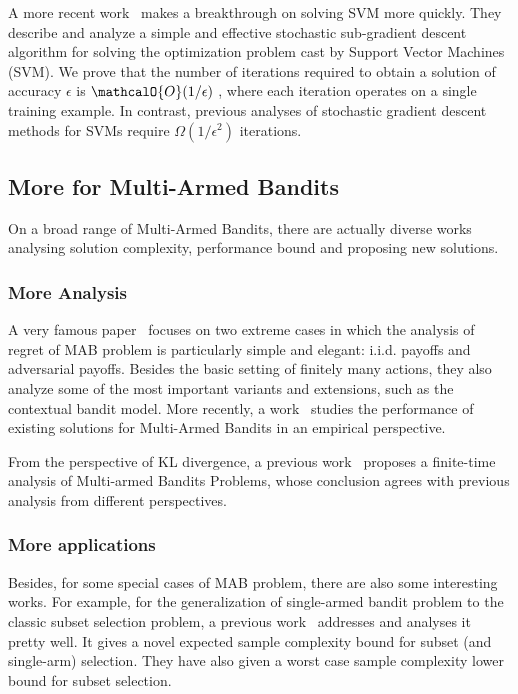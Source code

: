 \documentclass[11pt]{article}
\begin{document}
A more recent work~\cite{shalev2011pegasos} makes a breakthrough on solving SVM more quickly. They describe and analyze a simple and effective stochastic sub-gradient descent algorithm for solving the optimization problem cast by Support Vector Machines (SVM). We prove that the number of iterations required to obtain a solution of accuracy $\epsilon$ is  $\mathcalO{O}(1/\epsilon)$ , where each iteration operates on a single training example. In contrast, previous analyses of stochastic gradient descent methods for SVMs require $\Omega (1/\epsilon^2)$  iterations. 


\subsection{More for Multi-Armed Bandits}
On a broad range of Multi-Armed Bandits, there are actually diverse works analysing solution complexity, performance bound and proposing new solutions. 

\subsubsection{More Analysis}
A very famous paper~\cite{bubeck2012regret} focuses on two extreme cases in which the analysis of regret of MAB problem is particularly simple and elegant: i.i.d. payoffs and adversarial payoffs. Besides the basic setting of finitely many actions, they also analyze some of the most important variants and extensions, such as the contextual bandit model. More recently, a work~\cite{vermorel2005multi} studies the performance of existing solutions for Multi-Armed Bandits in an empirical perspective.

From the perspective of KL divergence, a previous work~\cite{maillard2011finite} proposes a finite-time analysis of Multi-armed Bandits Problems, whose conclusion agrees with previous analysis from different perspectives. 

\subsubsection{More applications}
Besides, for some special cases of MAB problem, there are also some interesting works. For example, for the generalization of single-armed bandit problem to the classic subset selection problem, a previous work~\cite{kalyanakrishnan2012pac} addresses and analyses it pretty well. It gives a novel expected sample complexity bound for subset (and single-arm) selection.
They have also given a worst case sample complexity
lower bound for subset selection.
\end{document}
